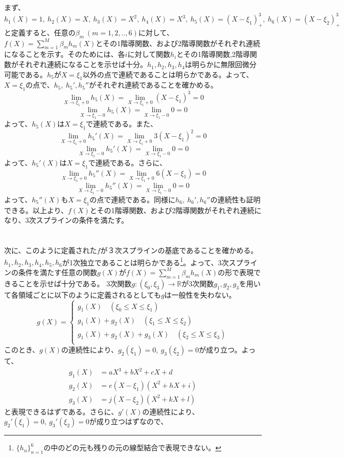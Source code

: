 \documentclass{jsarticle}
\begin{document}
まず、$h_1(X)=1,\ h_2(X)=X,\ h_3(X)=X^2,\ h_4(X)=X^3,\ h_5(X)=(X-\xi_1)_+^3,\ h_6(X)=(X-\xi_2)_+^3$と定義すると、任意の$\beta_m\ (m=1,2,..,6)$に対して、$f(X)=\sum_{m=1}^{M}\beta_m h_m(X)$とその1階導関数、および2階導関数がそれぞれ連続になることを示す。そのためには、各$i$に対して関数$h_i$とその1階導関数,2階導関数がそれぞれ連続になることを示せば十分。$h_1,h_2,h_3,h_4$は明らかに無限回微分可能である。$h_5$が$X=\xi_1$以外の点で連続であることは明らかである。よって、$X=\xi_1$の点で、$h_5,\ h_5', h_5''$がそれぞれ連続であることを確かめる。
\[\lim_{X\to\xi_1+0}h_5(X)=\lim_{X\to\xi_1+0}(X-\xi_1)^3=0\]
\[\lim_{X\to\xi_1-0}h_5(X)=\lim_{X\to\xi_1-0}0=0\]
よって、$h_5(X)$は$X=\xi_1$で連続である。また、
\[\lim_{X\to\xi_1+0}h_5'(X)=\lim_{X\to\xi_1+0}3(X-\xi_1)^2=0\]
\[\lim_{X\to\xi_1-0}h_5'(X)=\lim_{X\to\xi_1-0}0=0\]
よって、$h_5'(X)$は$X=\xi_1$で連続である。さらに、
\[\lim_{X\to\xi_1+0}h_5''(X)=\lim_{X\to\xi_1+0}6(X-\xi_1)=0\]
\[\lim_{X\to\xi_1-0}h_5''(X)=\lim_{X\to\xi_1-0}0=0\]
よって、$h_5''(X)$も$X=\xi_1$の点で連続である。同様に$h_6,\ h_6', h_6''$の連続性も証明できる。以上より、$f(X)$とその1階導関数、および2階導関数がそれぞれ連続になり、3次スプラインの条件を満たす。\\
\\
\\
次に、このように定義された$f$が３次スプラインの基底であることを確かめる。$h_1,h_2,h_3,h_4,h_5,h_6$が1次独立であることは明らかである\footnote{$\{h_n\}_{n=1}^6$の中のどの元も残りの元の線型結合で表現できない。}。よって、3次スプラインの条件を満たす任意の関数$g(X)$が$f(X)=\sum_{m=1}^{M}\beta_m h_m(X)$の形で表現できることを示せば十分である。
3次関数$g:(\xi_0,\xi_3)\rightarrow \mathbb{R}$が3次関数$g_1,g_2,g_3$を用いて各領域ごとに以下のように定義されるとしても$g$は一般性を失わない。
\[g(X)=
\begin{cases}
g_1(X)\quad(\xi_0\leq X\leq \xi_1)\\
g_1(X)+g_2(X)\quad(\xi_1\leq X\leq \xi_2)\\
g_1(X)+g_2(X)+g_3(X)\quad(\xi_2\leq X\leq \xi_3)\\
\end{cases}
\]
このとき、$g(X)$の連続性により、$g_2(\xi_1)=0,\ g_3(\xi_2)=0$が成り立つ。よって、
\begin{align*}
g_1(X)&=a X^3+ b X^2 + c X + d\\
g_2(X)&=e (X-\xi_1)(X^2 + hX+i) \\
g_3(X)&=j (X-\xi_2)(X^2 + kX + l)
\end{align*}
と表現できるはずである。さらに、$g'(X)$の連続性により、$g_2'(\xi_1)=0,\ g_3'(\xi_2)=0$が成り立つはずなので、
\end{document}

